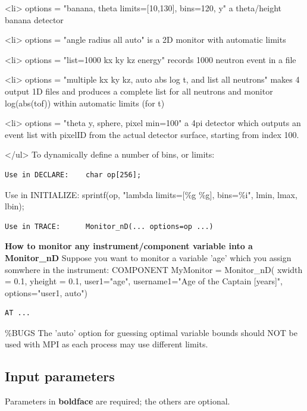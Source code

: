 \textless{}li\textgreater{} options = "banana, theta limits=[10,130], bins=120, y" a theta/height banana detector

\textless{}li\textgreater{} options = "angle radius all auto" is a 2D monitor with automatic limits

\textless{}li\textgreater{} options = "list=1000 kx ky kz energy" records 1000 neutron event in a file

\textless{}li\textgreater{} options = "multiple kx ky kz, auto abs log t, and list all neutrons" makes 4 output 1D files and produces a complete list for all neutrons and monitor log(abs(tof)) within automatic limits (for t)

\textless{}li\textgreater{} options = "theta y, sphere, pixel min=100" a 4pi detector which outputs an event list with pixelID from the actual detector surface, starting from index 100.

\textless{}/ul\textgreater{} To dynamically define a number of bins, or limits:

\begin{verbatim}
Use in DECLARE:    char op[256];
\end{verbatim}

Use in INITIALIZE: sprintf(op, "lambda limits=[\%g \%g], bins=\%i", lmin, lmax, lbin);

\begin{verbatim}
Use in TRACE:      Monitor_nD(... options=op ...)
\end{verbatim}

\textbf{How to monitor any instrument/component variable into a Monitor\_nD} Suppose you want to monitor a variable 'age' which you assign somwhere in the instrument: COMPONENT MyMonitor = Monitor\_nD( xwidth = 0.1, yheight = 0.1, user1="age", username1="Age of the Captain [years]", options="user1, auto")

\begin{verbatim}
AT ...
\end{verbatim}

\%BUGS The 'auto' option for guessing optimal variable bounds should NOT be used with MPI as each process may use different limits.

\subsection*{Input parameters}
Parameters in \textbf{boldface} are required; the others are optional.


